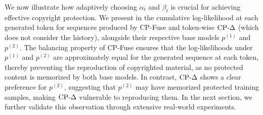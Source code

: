 

We now illustrate how adaptively choosing $\alpha_t$ and $\beta_t$ is crucial for achieving effective copyright protection. We present in  the cumulative log-likelihood at each generated token for sequences produced by CP-Fuse and token-wise $\text{CP-}\Delta$ (which does not consider the history), alongside their respective base models $p^{(1)}$ and $p^{(2)}$. The balancing property of CP-Fuse ensures that the log-likelihoods under $p^{(1)}$ and $p^{(2)}$ are approximately equal for the generated sequence at each token, thereby preventing the reproduction of copyrighted material, as no protected content is memorized by both base models. In contrast, $\text{CP-}\Delta$ shows a clear preference for $p^{(2)}$, suggesting that $p^{(2)}$ may have memorized protected training samples, making $\text{CP-}\Delta$ vulnerable to reproducing them. In the next section, we further validate this observation through extensive real-world experiments.







